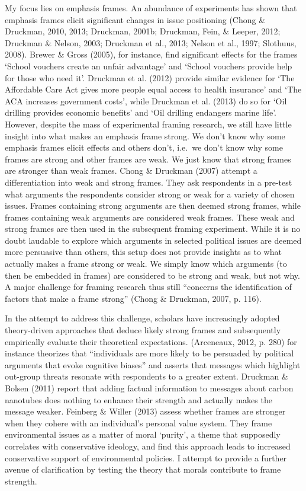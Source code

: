 \documentclass[12pt,econ]{sources/authesis}
\begin{document}
My focus lies on emphasis frames. An abundance of experiments has shown that emphasis frames elicit significant changes in issue positioning (Chong \& Druckman, 2010, 2013; Druckman, 2001b; Druckman, Fein, \& Leeper, 2012; Druckman \& Nelson, 2003; Druckman et al., 2013; Nelson et al., 1997; Slothuus, 2008). Brewer \& Gross (2005), for instance, find significant effects for the frames `School vouchers create an unfair advantage' and `School vouchers provide help for those who need it'. Druckman et al. (2012) provide similar evidence for `The Affordable Care Act gives more people equal access to health insurance' and `The ACA increases government costs', while Druckman et al. (2013) do so for `Oil drilling provides economic benefits' and `Oil drilling endangers marine life'. However, despite the mass of experimental framing research, we still have little insight into what makes an emphasis frame strong. We don't know why some emphasis frames elicit effects and others don't, i.e.~we don't know why some frames are strong and other frames are weak. We just know that strong frames are stronger than weak frames. Chong \& Druckman (2007) attempt a differentiation into weak and strong frames. They ask respondents in a pre-test what arguments the respondents consider strong or weak for a variety of chosen issues. Frames containing strong arguments are then deemed strong frames, while frames containing weak arguments are considered weak frames. These weak and strong frames are then used in the subsequent framing experiment. While it is no doubt laudable to explore which arguments in selected political issues are deemed more persuasive than others, this setup does not provide insights as to what actually makes a frame strong or weak. We simply know which arguments (to then be embedded in frames) are considered to be strong and weak, but not why. A major challenge for framing research thus still ``concerns the identification of factors that make a frame strong'' (Chong \& Druckman, 2007, p. 116).

In the attempt to address this challenge, scholars have increasingly adopted theory-driven approaches that deduce likely strong frames and subsequently empirically evaluate their theoretical expectations. (Arceneaux, 2012, p. 280) for instance theorizes that ``individuals are more likely to be persuaded by political arguments that evoke cognitive biases'' and asserts that messages which highlight out-group threats resonate with respondents to a greater extent. Druckman \& Bolsen (2011) report that adding factual information to messages about carbon nanotubes does nothing to enhance their strength and actually makes the message weaker. Feinberg \& Willer (2013) assess whether frames are stronger when they cohere with an individual's personal value system. They frame environmental issues as a matter of moral `purity', a theme that supposedly correlates with conservative ideology, and find this approach leads to increased conservative support of environmental policies. I attempt to provide a further avenue of clarification by testing the theory that morals contribute to frame strength.
\end{document}
